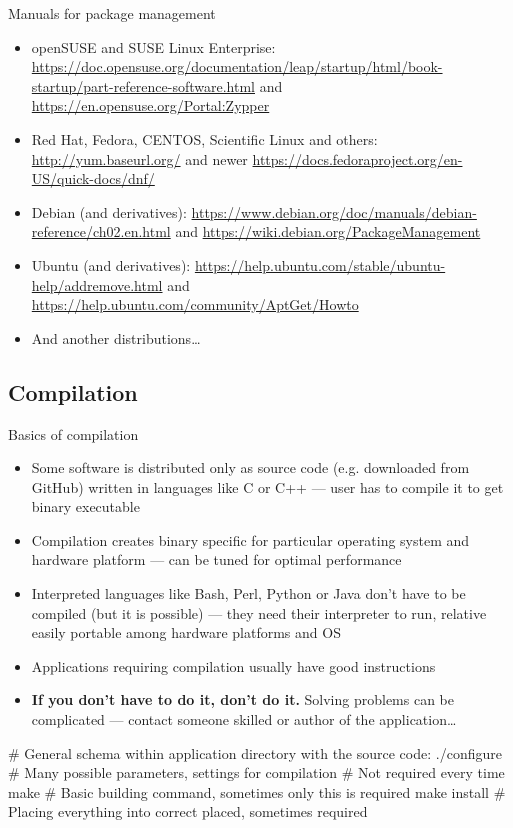 \documentclass[compress, ucs, xelatex, 11pt, xcolor=svgnames, aspectratio=169,
	hyperref={
		bookmarks=true,
		unicode=true,
		colorlinks=true,
		pdftitle={Linux, command line and MetaCentrum},
		plainpages=false,
		pdfauthor={Vojtech Zeisek},
		pdfsubject={Course about use of Linux command line, writing shell scripts and using MetaCentrum of CESNET},
		pdfcreator={XeLaTeX},
		pdfkeywords={Linux, GNU, BASH, shell, command line, MetaCentrum},
		linkcolor=DarkRed, %
		anchorcolor=DarkBlue, %
		citecolor=Indigo, %
		filecolor=NavyBlue, %
		menucolor=DarkMagenta, %
		urlcolor=DarkBlue, %
		pdftex},
	url={hyphens, lowtilde} %
	]{beamer}
\begin{document}
\begin{frame}{Manuals for package management}
	\begin{itemize}
		\item openSUSE and SUSE Linux Enterprise: \url{https://doc.opensuse.org/documentation/leap/startup/html/book-startup/part-reference-software.html} and \url{https://en.opensuse.org/Portal:Zypper}
		\item Red Hat, Fedora, CENTOS, Scientific Linux and others: \url{http://yum.baseurl.org/} and newer \url{https://docs.fedoraproject.org/en-US/quick-docs/dnf/}
		\item Debian (and derivatives): \url{https://www.debian.org/doc/manuals/debian-reference/ch02.en.html} and \url{https://wiki.debian.org/PackageManagement}
		\item Ubuntu (and derivatives): \url{https://help.ubuntu.com/stable/ubuntu-help/addremove.html} and \url{https://help.ubuntu.com/community/AptGet/Howto}
		\item And another distributions\ldots
	\end{itemize}
\end{frame}

\subsection{Compilation}

\begin{frame}[fragile]{Basics of compilation}
	\begin{itemize}
		\item Some software is distributed only as source code (e.g. downloaded from GitHub) written in languages like C or C++ --- user has to compile it to get binary executable
		\item Compilation creates binary specific for particular operating system and hardware platform --- can be tuned for optimal performance
		\item Interpreted languages like Bash, Perl, Python or Java don't have to be compiled (but it is possible) --- they need their interpreter to run, relative easily portable among hardware platforms and OS
		\item Applications requiring compilation usually have good instructions
		\item \textbf{If you don't have to do it, don't do it.}\textbf{} Solving problems can be complicated --- contact someone skilled or author of the application\ldots
	\end{itemize}
	\begin{bashcode}
    # General schema within application directory with the source code:
    ./configure # Many possible parameters, settings for compilation
                # Not required every time
    make # Basic building command, sometimes only this is required
    make install # Placing everything into correct placed, sometimes required
	\end{bashcode}
\end{frame}
\end{document}
